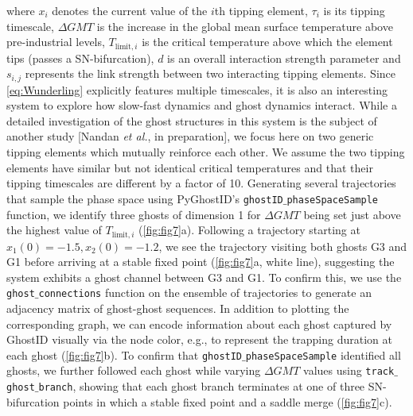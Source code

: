\documentclass{article}
\theoremstyle{definition}
\begin{document}
\begin{refsection}
where $x_i$ denotes the current value of the $i$th tipping element, $\tau_i$ is its tipping timescale, $\Delta GMT$ is the increase in the global mean surface temperature above pre-industrial levels, $T_{\text{limit},i}$ is the critical temperature above which the element tips (passes a SN-bifurcation), $d$ is an overall interaction strength parameter and $s_{i,j}$ represents the link strength between two interacting tipping elements. Since \autoref{eq:Wunderling} explicitly features multiple timescales, it is also an interesting system to explore how slow-fast dynamics and ghost dynamics interact. While a detailed investigation of the ghost structures in this system is the subject of another study [Nandan \textit{et al.}, in preparation], we focus here on two generic tipping elements which mutually reinforce each other. We assume the two tipping elements have similar but not identical critical temperatures and that their tipping timescales are different by a factor of 10. 
Generating several trajectories that sample the phase space using PyGhostID's {\tt ghostID$\_$phaseSpaceSample} function, we identify three ghosts of dimension 1 for $\Delta GMT$ being set just above the highest value of $T_{\text{limit},i}$ (\autoref{fig:fig7}a). Following a trajectory starting at $x_1(0)=-1.5, x_2(0)=-1.2$, we see the trajectory visiting both ghosts G3 and G1 before arriving at a stable fixed point (\autoref{fig:fig7}a, white line), suggesting the system exhibits a ghost channel \cite{Koch_2024} between G3 and G1. To confirm this, we use the {\tt ghost$\_$connections} function on the ensemble of trajectories to generate an adjacency matrix of ghost-ghost sequences. In addition to plotting the corresponding graph, we can encode information about each ghost captured by GhostID visually via the node color, e.g., to represent the trapping duration at each ghost (\autoref{fig:fig7}b). To confirm that {\tt ghostID$\_$phaseSpaceSample} identified all ghosts, we further followed each ghost while varying $\Delta GMT$ values using {\tt track$\_$ghost$\_$branch}, showing that each ghost branch terminates at one of three SN-bifurcation points in which a stable fixed point and a saddle merge (\autoref{fig:fig7}c). 


\end{refsection}
\end{document}
